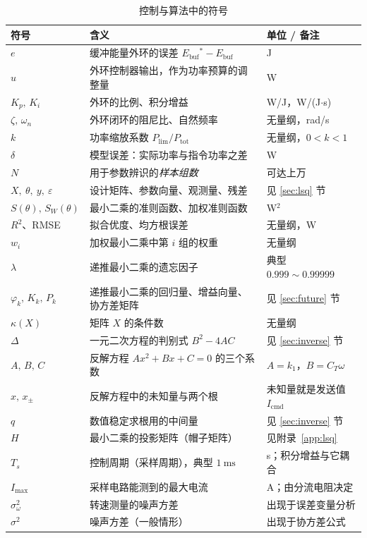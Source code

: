 \documentclass[cn,blue,11pt,device=normal]{elegantnote}
\newcommand{\Icmd}{I_{\mathrm{cmd}}{}}
\newcommand{\CT}{C_{T}{}}
\newcommand{\Ebuf}{E_{\mathrm{buf}}{}}
\newcommand{\Plim}{P_{\mathrm{lim}}{}}
\begin{document}
\begin{table}[htbp]
  \centering
  \small
  \caption{控制与算法中的符号}
  \label{tab:sym-control}
  \begin{tabular}{@{}>{\raggedright\arraybackslash}p{}>{\raggedright\arraybackslash}p{}>{\raggedright\arraybackslash}p{}@{}}
    \toprule
    符号 & 含义 & 单位 / 备注 \\
    \midrule
    $e$              & 缓冲能量外环的误差 $\Ebuf^{\ast}-\Ebuf$ & J \\
    $u$              & 外环控制器输出，作为功率预算的调整量 & W \\
    $K_p,\,K_i$      & 外环的比例、积分增益 & W/J，W/(J$\cdot$s) \\
    $\zeta,\,\omega_n$ & 外环闭环的阻尼比、自然频率 & 无量纲，rad/s \\
    $k$              & 功率缩放系数 $\Plim/P_{\mathrm{tot}}$ & 无量纲，$0<k<1$ \\
    $\delta$         & 模型误差：实际功率与指令功率之差 & W \\
    $N$              & 用于参数辨识的\emph{样本组数} & 可达上万 \\
    $X,\ \theta,\ y,\ \varepsilon$ & 设计矩阵、参数向量、观测量、残差 & 见 \ref{sec:lsq} 节 \\
    $S(\theta),\,S_W(\theta)$ & 最小二乘的准则函数、加权准则函数 & W$^{2}$ \\
    $R^{2}$、RMSE   & 拟合优度、均方根误差 & 无量纲，W \\
    $w_i$            & 加权最小二乘中第 $i$ 组的权重 & 无量纲 \\
    $\lambda$        & 递推最小二乘的遗忘因子 & 典型 $0.999\sim0.99999$ \\
    $\varphi_k,\,K_k,\,P_k$ & 递推最小二乘的回归量、增益向量、协方差矩阵 & 见 \ref{sec:future} 节 \\
    $\kappa(X)$      & 矩阵 $X$ 的条件数 & 无量纲 \\
    $\Delta$         & 一元二次方程的判别式 $B^{2}-4AC$ & 见 \ref{sec:inverse} 节 \\
    $A,\,B,\,C$      & 反解方程 $Ax^{2}+Bx+C=0$ 的三个系数 & $A=k_1$，$B=\CT\omega$ \\
    $x,\,x_\pm$      & 反解方程中的未知量与两个根 & 未知量就是发送值 $\Icmd$ \\
    $q$              & 数值稳定求根用的中间量 & 见 \ref{sec:inverse} 节 \\
    $H$              & 最小二乘的投影矩阵（帽子矩阵） & 见附录~\ref{app:lsq} \\
    $T_s$            & 控制周期（采样周期），典型 $1\ \mathrm{ms}$ & s；积分增益与它耦合 \\
    $I_{\max}$       & 采样电路能测到的最大电流 & A；由分流电阻决定 \\
    $\sigma_\omega^{2}$ & 转速测量的噪声方差 & 出现于误差变量分析 \\
    $\sigma^{2}$     & 噪声方差（一般情形） & 出现于协方差公式 \\
    \bottomrule
  \end{tabular}
\end{table}
\end{document}
